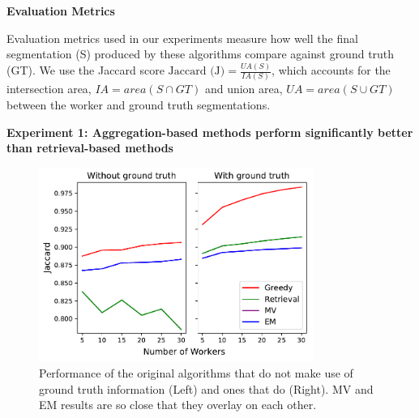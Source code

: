 \documentclass[letterpaper]{article}
\newcommand{\agp}[1]{\textcolor{magenta}{Aditya: #1}}
\newcommand{\dor}[1]{\textcolor{blue}{Doris: #1}}
\newcommand{\stitle}[1]{\noindent \textbf{#1}}
\begin{document}
\stitle{Evaluation Metrics}
\par \noindent Evaluation metrics used in our experiments measure how well the final segmentation (S) produced by these algorithms compare against ground truth (GT). We use the Jaccard score $\text{Jaccard (J)} = \frac{UA(S)}{IA(S)}$, which accounts for the intersection area, $IA=area(S\cap GT)$ and union area, $UA=area(S\cup GT)$ between the worker and ground truth segmentations.

\stitle{Experiment 1: Aggregation-based methods perform significantly better than retrieval-based methods}
\begin{figure}[h!]
   \centering
   \includegraphics[trim={0 1pt 4pt 0},clip,width=0.8\textwidth]{plots/Retrieval_vs_Aggregation.pdf}
   \caption{Performance of the original algorithms that do not make use of ground truth information (Left) and ones that do (Right). MV and EM results are so close that they overlay on each other.} %
   \label{retrieval_vs_aggregation}   
\end{figure} 
\end{document}

